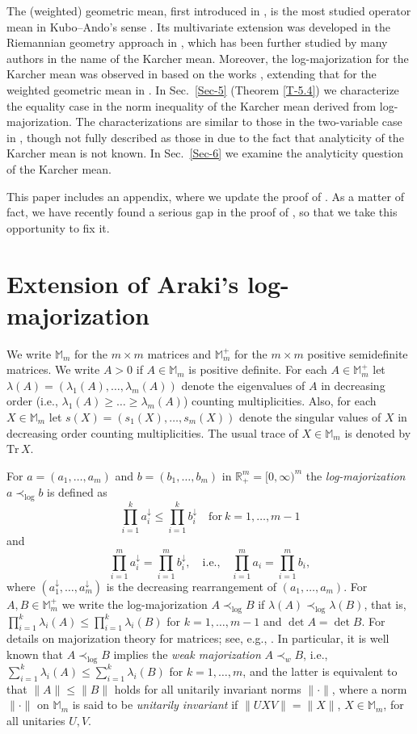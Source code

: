 \documentclass[11pt,reqno]{article}
\numberwithin{equation}{section}
\def\bR{\mathbb{R}}
\def\bM{\mathbb{M}}
\def\Tr{\mathrm{Tr}}
\begin{document}
The (weighted) geometric mean, first introduced in \cite{PW}, is the most studied operator mean in
Kubo--Ando's sense \cite{KA}. Its multivariate extension was developed in the Riemannian geometry approach
in \cite{BH,LL1,Mo}, which has been further studied by many authors in the name of the Karcher mean.
Moreover, the log-majorization for the Karcher mean was observed in \cite{HP} based on the works \cite{BK,Ya},
extending that for the weighted geometric mean in \cite{AH}. In Sec.~\ref{Sec-5} (Theorem \ref{T-5.4}) we
characterize the equality case in the norm inequality of the Karcher mean derived from log-majorization. The
characterizations are similar to those in the two-variable case in \cite[Theorem 3.1]{Hi}, though not fully
described as those in \cite{Hi} due to the fact that analyticity of the Karcher mean is not known. In
Sec.~\ref{Sec-6} we examine the analyticity question of the Karcher mean.

This paper includes an appendix, where we update the proof of \cite[Theorem 2.1]{Hi}. As a matter of fact, we
have recently found a serious gap in the proof of \cite{Hi}, so that we take this opportunity to fix it.

\section{Extension of Araki's log-majorization}\label{Sec-2}

We write $\bM_m$ for the $m\times m$ matrices and $\bM_m^+$ for the $m\times m$ positive semidefinite
matrices. We write $A>0$ if $A\in\bM_m$ is positive definite. For each $A\in\bM_m^+$ let
$\lambda(A)=(\lambda_1(A),\dots,\lambda_m(A))$ denote the eigenvalues of $A$ in decreasing order (i.e.,
$\lambda_1(A)\ge\dots\ge\lambda_m(A)$) counting multiplicities. Also, for each $X\in\bM_m$ let
$s(X)=(s_1(X),\dots,s_m(X))$ denote the singular values of $X$ in decreasing order counting multiplicities.
The usual trace of $X\in\bM_m$ is denoted by $\Tr\,X$.

For $a=(a_1,\dots,a_m)$ and $b=(b_1,\dots,b_m)$ in $\bR_+^m=[0,\infty)^m$ the \emph{log-majorization}
$a\prec_{\log}b$ is defined as
\[
\prod_{i=1}^ka_i^\downarrow\le\prod_{i=1}^kb_i^\downarrow\quad\mbox{for}\ k=1,\dots,m-1
\]
and
\[
\prod_{i=1}^ma_i^\downarrow=\prod_{i=1}^mb_i^\downarrow,\quad
\mbox{i.e.,}\quad\prod_{i=1}^ma_i=\prod_{i=1}^mb_i,
\]
where $(a_1^\downarrow,\dots,a_m^\downarrow)$ is the decreasing rearrangement of $(a_1,\dots,a_m)$. For
$A,B\in\bM_m^+$ we write the log-majorization $A\prec_{\log}B$ if $\lambda(A)\prec_{\log}\lambda(B)$, that is,
$\prod_{i=1}^k\lambda_i(A)\le\prod_{i=1}^k\lambda_i(B)$ for $k=1,\dots,m-1$ and $\det A=\det B$. For details on
majorization theory for matrices; see, e.g., \cite{An,Bh,Hi1,MOA}. In particular, it is well known
\cite[Proposition 4.4.13]{Hi1} that $A\prec_{\log}B$ implies the \emph{weak majorization} $A\prec_wB$, i.e.,
$\sum_{i=1}^k\lambda_i(A)\le\sum_{i=1}^k\lambda_i(B)$ for $k=1,\dots,m$, and the latter is equivalent to that
$\|A\|\le\|B\|$ holds for all unitarily invariant norms $\|\cdot\|$, where a norm $\|\cdot\|$ on $\bM_m$ is said to be
\emph{unitarily invariant} if $\|UXV\|=\|X\|$, $X\in\bM_m$, for all unitaries $U,V$.
\end{document}
